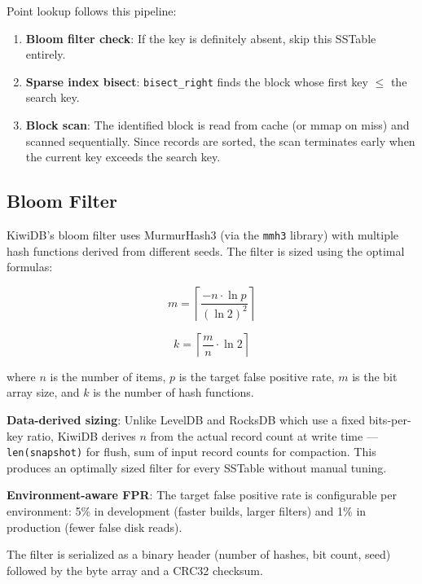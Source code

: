 \documentclass[conference]{IEEEtran}
\begin{document}
Point lookup follows this pipeline:
\begin{enumerate}[leftmargin=*]
    \item \textbf{Bloom filter check}: If the key is definitely absent, skip this SSTable entirely.
    \item \textbf{Sparse index bisect}: \texttt{bisect\_right} finds the block whose first key $\leq$ the search key.
    \item \textbf{Block scan}: The identified block is read from cache (or mmap on miss) and scanned sequentially. Since records are sorted, the scan terminates early when the current key exceeds the search key.
\end{enumerate}

\subsection{Bloom Filter}

KiwiDB's bloom filter uses MurmurHash3 (via the \texttt{mmh3} library) with multiple hash functions derived from different seeds. The filter is sized using the optimal formulas:

\begin{equation}
m = \left\lceil \frac{-n \cdot \ln p}{(\ln 2)^2} \right\rceil
\label{eq:bloom_bits}
\end{equation}

\begin{equation}
k = \left\lceil \frac{m}{n} \cdot \ln 2 \right\rceil
\label{eq:bloom_hashes}
\end{equation}

where $n$ is the number of items, $p$ is the target false positive rate, $m$ is the bit array size, and $k$ is the number of hash functions.

\textbf{Data-derived sizing}: Unlike LevelDB and RocksDB which use a fixed bits-per-key ratio, KiwiDB derives $n$ from the actual record count at write time --- \texttt{len(snapshot)} for flush, sum of input record counts for compaction. This produces an optimally sized filter for every SSTable without manual tuning.

\textbf{Environment-aware FPR}: The target false positive rate is configurable per environment: 5\% in development (faster builds, larger filters) and 1\% in production (fewer false disk reads).

The filter is serialized as a binary header (number of hashes, bit count, seed) followed by the byte array and a CRC32 checksum.
\end{document}
